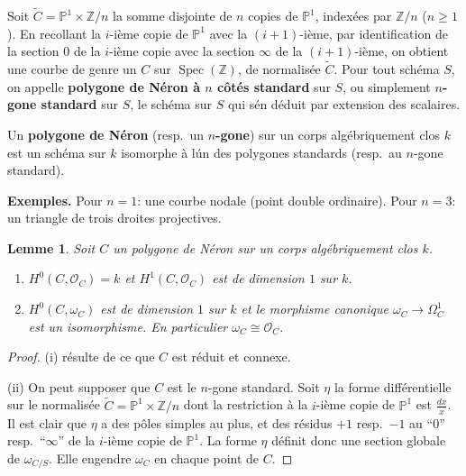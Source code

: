 \documentclass{amsart}
\theoremstyle{plain}
\newtheorem{lemma}[theorem]{Lemme}
\theoremstyle{remark}
\DeclareMathOperator{\Spec}{Spec}
\newcommand{\cO}{\mathcal{O}}
\newcommand{\bbP}{\mathbb{P}}
\newcommand{\bbZ}{\mathbb{Z}}
\begin{document}
\subsubsection{}
Soit $\widetilde{C} = \bbP^1 \times \bbZ/n$ la somme disjointe de $n$ copies de $\bbP^1$,
index\'ees par $\bbZ/n$ ($n \geq 1$). En recollant la $i$-i\`eme copie de $\bbP^1$ avec la
$(i+1)$-i\`eme, par identification de la section $0$ de la $i$-i\`eme copie avec la section
$\infty$ de la $(i+1)$-i\`eme, on obtient une courbe de genre un $C$ sur $\Spec(\bbZ)$,
de normalis\'ee $\widetilde{C}$. Pour tout sch\'ema $S$, on appelle \textbf{polygone de N\'eron
\`a $n$ c\^ot\'es standard} sur $S$, ou simplement \textbf{$n$-gone standard} sur $S$, le
sch\'ema sur $S$ qui s\'en d\'eduit par extension des scalaires.

Un \textbf{polygone de N\'eron} (resp.~un \textbf{$n$-gone}) sur un corps alg\'ebriquement
clos $k$ est un sch\'ema sur $k$ isomorphe \`a l\'un des polygones standards
(resp.~au $n$-gone standard).

\textbf{Exemples.} Pour $n=1$: une courbe nodale (point double ordinaire).
Pour $n=3$: un triangle de trois droites projectives.

\begin{lemma}
Soit $C$ un polygone de N\'eron sur un corps alg\'ebriquement clos $k$.
\begin{enumerate}
\item[(i)] $H^0(C, \cO_C) = k$ et $H^1(C, \cO_C)$ est de dimension $1$ sur $k$.
\item[(ii)] $H^0(C, \omega_C)$ est de dimension $1$ sur $k$ et le morphisme canonique
$\omega_C \to \Omega_C^1$ est un isomorphisme. En particulier $\omega_C \cong \cO_C$.
\end{enumerate}
\end{lemma}

\begin{proof}
(i) r\'esulte de ce que $C$ est r\'eduit et connexe.

(ii) On peut supposer que $C$ est le $n$-gone standard. Soit $\eta$ la forme
diff\'erentielle sur le normalis\'ee $\widetilde{C} = \bbP^1 \times \bbZ/n$ dont la restriction
\`a la $i$-i\`eme copie de $\bbP^1$ est $\frac{dx}{x}$. Il est clair que $\eta$ a des p\^oles
simples au plus, et des r\'esidus $+1$ resp.~$-1$ au ``$0$'' resp.~``$\infty$'' de la
$i$-i\`eme copie de $\bbP^1$. La forme $\eta$ d\'efinit donc une section globale de
$\omega_{C/S}$. Elle engendre $\omega_C$ en chaque point de $C$.
\end{proof}
\end{document}
